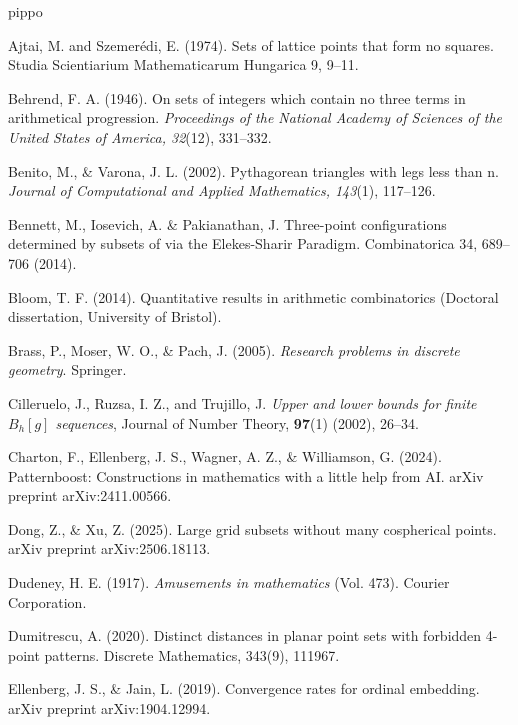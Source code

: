 \documentclass[11pt]{article}
\theoremstyle{plain}
\begin{document}
	
	\footnotesize
	\begin{thebibliography}{pippo}
		
		 Ajtai, M. and Szemerédi, E. (1974). Sets of lattice points that form no squares.  Studia Scientiarium
		Mathematicarum Hungarica 9, 9–11.
		
		 Behrend, F. A. (1946). On sets of integers which contain no three terms in arithmetical progression. \textit{Proceedings of the National Academy of Sciences of the United States of America, 32}(12), 331–332. %
		
		 Benito, M., \& Varona, J. L. (2002). Pythagorean triangles with legs less than n. \textit{Journal of Computational and Applied Mathematics, 143}(1), 117–126. %
		
		 Bennett, M., Iosevich, A. \& Pakianathan, J. Three-point configurations determined by subsets of 
		via the Elekes-Sharir Paradigm. Combinatorica 34, 689–706 (2014).
		
		 Bloom, T. F. (2014). Quantitative results in arithmetic combinatorics (Doctoral dissertation, University of Bristol).
		
		 Brass, P., Moser, W. O., \& Pach, J. (2005). \textit{Research problems in discrete geometry}. Springer.
		
		Cilleruelo, J.,  Ruzsa, I. Z.,  and  Trujillo, J.
		\textit{Upper and lower bounds for finite $B_h[g]$ sequences},
		Journal of Number Theory, \textbf{97}(1) (2002), 26--34.
		
		
		 Charton, F., Ellenberg, J. S., Wagner, A. Z., \& Williamson, G. (2024). Patternboost: Constructions in mathematics with a little help from 
		AI. arXiv preprint arXiv:2411.00566. 
		
		 Dong, Z., \& Xu, Z. (2025). Large grid subsets without many cospherical points. arXiv preprint arXiv:2506.18113.
		
		Dudeney, H. E. (1917). {\em Amusements in mathematics} (Vol. 473). Courier Corporation.
		
		 Dumitrescu, A. (2020). Distinct distances in planar point sets with forbidden 4-point patterns. Discrete Mathematics, 343(9), 111967.
		
		 Ellenberg, J. S., \& Jain, L. (2019). Convergence rates for ordinal embedding. arXiv preprint arXiv:1904.12994.
		

\end{thebibliography}
\end{document}
